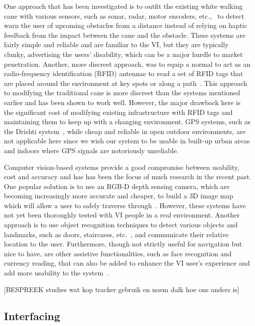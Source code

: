 \documentclass[format=sigconf, review=true, screen=true, anonymous=true]{acmart}
\begin{document}
One approach that has been investigated is to outfit the existing white walking cane with various sensors, such as sonar, radar, motor encoders, etc.,~\cite{ulrich1997, marion2008batcane} to detect warn the user of upcoming obstacles from a distance instead of relying on haptic feedback from the impact between the cane and the obstacle. These systems are fairly simple and reliable and are familiar to the VI, but they are typically clunky, advertising the users' disability, which can be a major hurdle to market penetration. Another, more discreet approach, was to equip a normal to act as an radio-frequency identification (RFID) antennae to read a set of RFID tags that are placed around the environment at key spots or along a path~\cite{faria2010electronic, willis2005}. This approach to modifying the traditional cane is more discreet than the systems mentioned earlier and has been shown to work well. However, the major drawback here is the significant cost of modifying existing infrastructure with RFID tags and maintaining them to keep up with a changing environment. GPS systems, such as the Drishti system~\cite{ran2004drishti}, while cheap and reliable in open outdoor environments, are not applicable here since we wish our system to be usable in built-up urban areas and indoors where GPS signals are notoriously unreliable. 

Computer vision-based systems provide a good compromise between usability, cost and accuracy and has has been the focus of much research in the recent past. One popular solution is to use an RGB-D depth sensing camera, which are becoming increasingly more accurate and cheaper, to build a 3D image map which will allow a user to safely traverse through~\cite{lee2015, rodriguez2012obstacle}. However, these systems have not yet been thoroughly tested with VI people in a real environment. Another approach is to use object recognition techniques to detect various objects and landmarks, such as doors, staircases, etc.~\cite{tian2013b}, and communicate their relative location to the user. Furthermore, though not strictly useful for navigation but nice to have, are other assistive functionalities, such as face recognition and currency reading, that can also be added to enhance the VI user's experience and add more usability to the system~\cite{chessa2016}.

[BESPREEK studies wat kop tracker gebruik en noem dalk hoe ons anders is]

\subsection{Interfacing}
\end{document}
